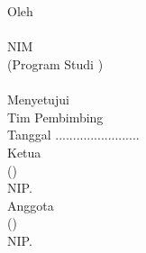 \chapter*{\MakeUppercase{\thesistitle}}
\centering

Oleh \\
\textbf{\authorname} \\
NIM \textbf{\authornim} \\
(Program Studi \major) \\[0.5cm]

\university \\[1cm]

Menyetujui \\
Tim Pembimbing \\
Tanggal ........................\\[1cm]

Ketua\\[2cm]
(\underline{\dospemsatu}) \\
NIP. \\[1cm]

Anggota\\[2cm]
(\underline{\dospemdua}) \\
NIP.\\
